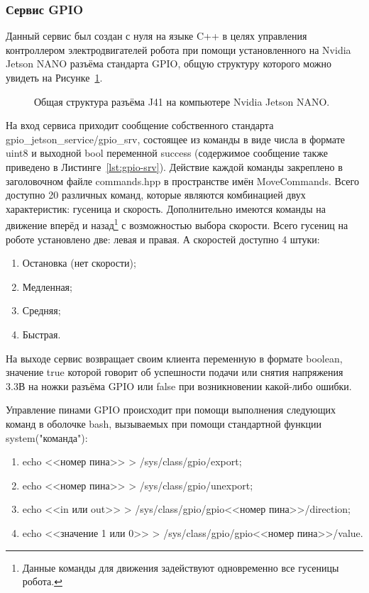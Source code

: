 \subsubsection{Сервис GPIO}
Данный сервис был создан с нуля на языке C++ в целях управления контроллером электродвигателей робота при помощи установленного на Nvidia Jetson NANO разъёма стандарта GPIO, общую структуру которого можно увидеть на Рисунке~\ref{fig:jetson-gpio}.

\begin{figure}[ht]
  \caption{Общая структура разъёма J41 на компьютере Nvidia Jetson NANO.}\label{fig:jetson-gpio}
\end{figure}

На вход сервиса приходит сообщение собственного стандарта gpio\_jetson\_service/gpio\_srv, состоящее из команды в виде числа в формате uint8 и выходной bool переменной success (содержимое сообщение также приведено в Листинге~\ref{lst:gpio-srv}). Действие каждой команды закреплено в заголовочном файле commands.hpp в пространстве имён MoveCommands. Всего доступно 20 различных команд, которые являются комбинацией двух характеристик: гусеница и скорость. Дополнительно имеются команды на движение вперёд и назад\footnote{Данные команды для движения задействуют одновременно все гусеницы робота.} с возможностью выбора скорости. Всего гусениц на роботе установлено две: левая и правая. А скоростей доступно 4 штуки:

\begin{enumerate}
\item Остановка (нет скорости);
\item Медленная;
\item Средняя;
\item Быстрая.
\end{enumerate}

На выходе сервис возвращает своим клиента переменную в формате boolean, значение true которой говорит об успешности подачи или снятия напряжения 3.3В на ножки разъёма GPIO или false при возникновении какой-либо ошибки.

Управление пинами GPIO происходит при помощи выполнения следующих команд в оболочке bash, вызываемых при помощи стандартной функции system("команда"):
\begin{enumerate}
\item echo <<номер пина>> > /sys/class/gpio/export;
\item echo <<номер пина>> > /sys/class/gpio/unexport;
\item echo <<in или out>> > /sys/class/gpio/gpio<<номер пина>>/direction;
\item echo <<значение 1 или 0>> > /sys/class/gpio/gpio<<номер пина>>/value.
\end{enumerate} 

